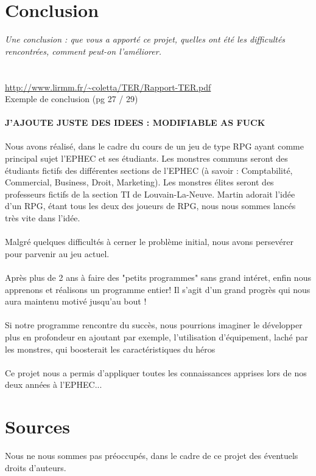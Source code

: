 \documentclass[a4paper,titlepage]{article}
\begin{document}
	\section{Conclusion}
	\textit{Une conclusion : que vous a apporté ce projet, quelles ont été les difficultés rencontrées, comment peut-on l’améliorer.}\\
	\\
	\\ \url{http://www.lirmm.fr/~coletta/TER/Rapport-TER.pdf} \\
	 Exemple de conclusion (pg 27 / 29)
	 \\
	 \\
	 \textbf{J'AJOUTE JUSTE DES IDEES : MODIFIABLE AS FUCK}\\
	\\
	Nous avons réalisé, dans le cadre du cours de  un jeu de type RPG ayant comme principal sujet l'EPHEC et ses étudiants. Les monstres communs seront des étudiants fictifs des différentes sections de l'EPHEC (à savoir : Comptabilité, Commercial, Business, Droit, Marketing). Les monstres élites seront des professeurs fictifs de la section TI de Louvain-La-Neuve.
	Martin adorait l'idée d'un RPG, étant tous les deux des joueurs de RPG, nous nous sommes lancés très vite dans l'idée.
	\\
	\\
	Malgré quelques difficultés à cerner le problème initial, nous avons persevérer pour parvenir au jeu actuel.
	\\
	\\
	Après plus de 2 ans à faire des "petits programmes" sans grand intéret, enfin nous apprenons et réalisons un programme entier! Il s'agit d'un grand progrès qui nous aura maintenu motivé jusqu'au bout !
	\\
	\\
	Si notre programme rencontre du succès, nous pourrions imaginer le développer plus en profondeur en ajoutant par exemple, l'utilisation d'équipement, laché par les monstres, qui boosterait les caractéristiques du héros
	\\
	\\
	Ce projet nous a permis d'appliquer toutes les connaissances apprises lors de nos deux années à l'EPHEC...
	
	\clearpage
	\section*{Sources }
\danger Nous ne nous sommes pas préoccupés, dans le cadre de ce projet des éventuels droits d'auteurs.\\
\end{document}
